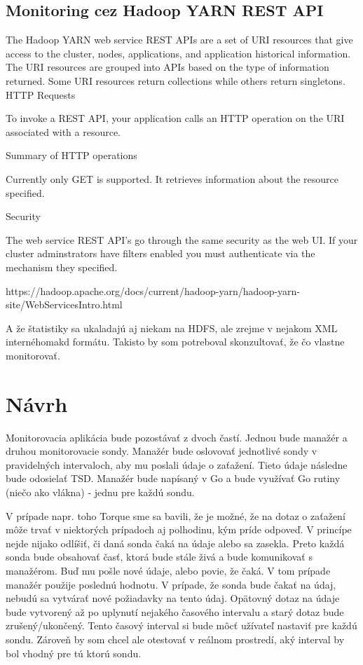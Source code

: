 \documentclass[11pt,final,oneside]{fithesis}
\begin{document}
\section{Monitoring cez Hadoop YARN REST API}
The Hadoop YARN web service REST APIs are a set of URI resources that give access to the cluster, nodes, applications, and application historical information. The URI resources are grouped into APIs based on the type of information returned. Some URI resources return collections while others return singletons.
HTTP Requests

To invoke a REST API, your application calls an HTTP operation on the URI associated with a resource.

Summary of HTTP operations

Currently only GET is supported. It retrieves information about the resource specified.

Security

The web service REST API’s go through the same security as the web UI. If your cluster adminstrators have filters enabled you must authenticate via the mechanism they specified.

https://hadoop.apache.org/docs/current/hadoop-yarn/hadoop-yarn-site/WebServicesIntro.html

A že štatistiky sa ukaladajú aj niekam na HDFS, ale zrejme v nejakom XML internéhomakd
formátu. Takisto by som potreboval skonzultovať, že čo vlastne monitorovať.

\chapter{Návrh}
Monitorovacia aplikácia bude pozostávať z dvoch častí. Jednou bude manažér a druhou monitorovacie sondy. Manažér bude oslovovať jednotlivé sondy v pravidelných intervaloch, aby mu poslali údaje o zaťažení.
Tieto údaje následne bude odosielať TSD. Manažér bude napísaný v Go a bude využívať Go rutiny (niečo ako vlákna) - jednu pre každú sondu.

V prípade napr. toho Torque sme sa bavili, že je možné, že na dotaz o zaťažení môže trvať v niektorých prípadoch aj polhodinu, kým príde odpoveď. V princípe nejde nijako odlíšiť, či daná sonda čaká na údaje
alebo sa zasekla. Preto každá sonda bude obsahovať časť, ktorá bude stále živá a bude komunikovať s manažérom. Buď mu pošle nové údaje, alebo povie, že čaká. V tom prípade manažér použije poslednú hodnotu.
V prípade, že sonda bude čakať na údaj, nebudú sa vytvárať nové požiadavky na tento údaj. Opätovný dotaz na údaje bude vytvorený až po uplynutí nejakého časového intervalu a starý dotaz bude zrušený/ukončený.
Tento časový interval si bude môcť užívateľ nastaviť pre každú sondu. Zároveň by som chcel ale otestovať v reálnom prostredí, aký interval by bol vhodný pre tú ktorú sondu.
\end{document}

